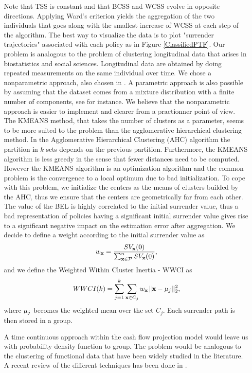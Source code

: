 Note that TSS is constant and that BCSS and WCSS evolve in opposite directions. Applying Ward's criterion yields the aggregation of the two individuals that goes along with the smallest increase of WCSS at each step of the algorithm. The best way to visualize the data is to plot "surrender trajectories" associated with each policy as in Figure \ref{ClassifiedPTF}. Our problem is analogous to the problem of clustering longitudinal data that arises in biostatistics and social sciences. Longitudinal data are obtained by doing repeated measurements on the same individual over time. We chose a nonparametric approach, also chosen in \citet{GeFa10,HeSkTh12}. A parametric approach is also possible by assuming that the dataset comes from a mixture distribution with a finite number of components, see \citet{Na99} for instance. We believe that the nonparametric approach is easier to implement and clearer from a practionner point of view.\\
The KMEANS method, that takes the number of clusters as a parameter, seems to be more suited to the problem than the agglomerative hierarchical clustering method. In the Agglomerative Hierarchical Clustering (AHC) algorithm the partition in $k$ sets depends on the previous partition. Furthermore, the KMEANS algorithm is less greedy in the sense that fewer distances need to be computed. However the KMEANS algorithm is an optimization algorithm and the common problem is the convergence to a local optimum due to bad initialization. To cope with this problem, we initialize the centers as the means of clusters builded by the AHC, thus we ensure that the centers are geometrically far from each other. The value of the BEL is highly correlated to the initial surrender value, thus a bad representation of policies having a significant initial surrender value gives rise to a significant negative impact on the estimation error after aggregation. We decide to define a weight according to the initial surrender value as
\begin{equation}\label{Weight}
w_{\bold{x}}=\frac{SV_{\bold{x}}(0)}{\sum_{\bold{x}\in\cal{P}}^{n}SV_{\bold{x}}(0)},
\end{equation}
and we define the Weighted Within Cluster Inertia - WWCI as 
\begin{equation}\label{WCI}
WWCI(k)=\sum_{j=1}^{k}\sum_{\bold{x}\in C_{j}}w_{\bold{x}}||\bold{x}-\bold{\mu}_{j}||_{2}^{2},
\end{equation}
where $\bold{\mu}_{j}$ becomes the weighted mean over the set $C_{j}$. Each surrender path is then stored in a group.
\begin{Rk}
A time continuous approach within the cash flow projection model would leave us with probability density function to group. The problem would be analogous to the clustering of functional data that have been widely studied in the literature. A recent review of the different techniques has been done in \citet{JaPr13}.
\end{Rk}
